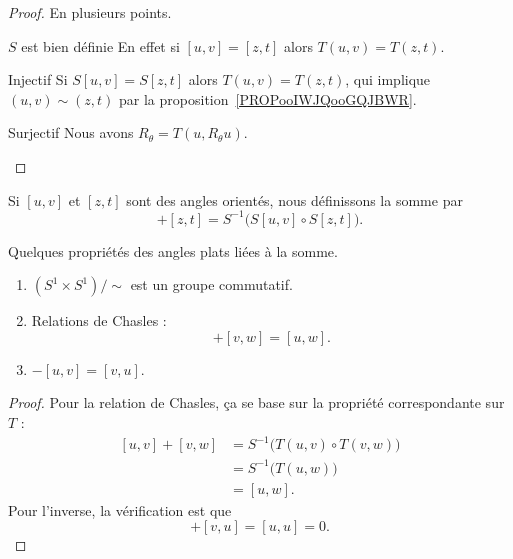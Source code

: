 \begin{proof}
    En plusieurs points.
    \begin{subproof}
    \item[\( S\) est bien définie]
        En effet si \( [u,v]=[z,t]\) alors \( T(u,v)=T(z,t)\).
    \item[Injectif]
        Si \( S[u,v]=S[z,t]\) alors \( T(u,v)=T(z,t)\), qui implique \( (u,v)\sim (z,t)\) par la proposition~\ref{PROPooIWJQooGQJBWR}.
    \item[Surjectif]
        Nous avons \( R_{\theta}=T(u,R_{\theta}u)\).
    \end{subproof}
\end{proof}

\begin{definition}
    Si \( [u,v]\) et \( [z,t]\) sont des angles orientés, nous définissons la somme par
    \begin{equation}
        [u,v]+[z,t]=S^{-1}\Big( S[u,v]\circ S[z,t] \Big).
    \end{equation}
\end{definition}

\begin{lemma}       \label{LEMooWISVooYsStJp}
    Quelques propriétés des angles plats liées à la somme.
    \begin{enumerate}
        \item
            \( (S^1\times S^1)/\sim\) est un groupe commutatif.
        \item       \label{ITEMooBKTFooWbEvIU}
            Relations de Chasles :
            \begin{equation}
                [u,v]+[v,w]=[u,w].
            \end{equation}
        \item
            \( -[u,v]=[v,u]\).
    \end{enumerate}
\end{lemma}

\begin{proof}
    Pour la relation de Chasles, ça se base sur la propriété correspondante sur \( T\) :
    \begin{subequations}
        \begin{align}
            [u,v]+[v,w]&=S^{-1}\Big( T(u,v)\circ T(v,w) \Big)\\
            &=S^{-1}\big( T(u,w) \big)\\
            &=[u,w].
        \end{align}
    \end{subequations}
    Pour l'inverse, la vérification est que
    \begin{equation}
        [u,v]+[v,u]=[u,u]=0.
    \end{equation}
\end{proof}


